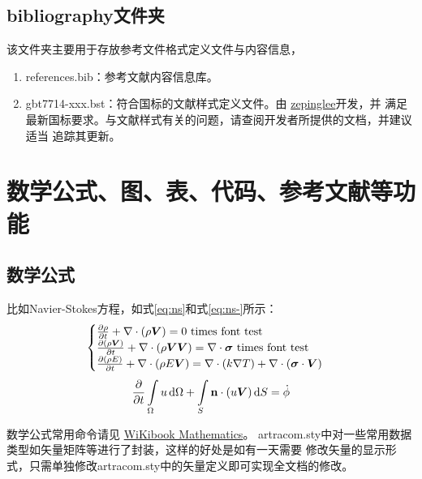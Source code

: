 \subsection{bibliography文件夹}

该文件夹主要用于存放参考文件格式定义文件与内容信息，

\begin{enumerate}
    \item references.bib：参考文献内容信息库。
    \item gbt7714-xxx.bst：符合国标的文献样式定义文件。由
    \href{https://github.com/zepinglee/gbt7714-bibtex-style}{zepinglee}开发，并
    满足最新国标要求。与文献样式有关的问题，请查阅开发者所提供的文档，并建议适当
    追踪其更新。
\end{enumerate}

\section{数学公式、图、表、代码、参考文献等功能}

\subsection{数学公式}

比如Navier-Stokes方程，如式\eqref{eq:ns}和式\eqref{eq:ns-}所示：
\begin{equation} \label{eq:ns}
    \begin{cases}
        \frac{\partial \rho}{\partial t} + \nabla\cdot(\rho\Vector{V}) = 0 \ \mathrm{times\ font\ test}\\
        \frac{\partial (\rho\Vector{V})}{\partial t} + \nabla\cdot(\rho\Vector{V}\Vector{V}) = \nabla\cdot\Tensor{\sigma} \ \text{times font test}\\
        \frac{\partial (\rho E)}{\partial t} + \nabla\cdot(\rho E\Vector{V}) = \nabla\cdot(k\nabla T) + \nabla\cdot(\Tensor{\sigma}\cdot\Vector{V})
    \end{cases}
\end{equation}
\begin{equation} \label{eq:ns-}
    \frac{\partial }{\partial t}\int\limits_{\Omega} u \, \mathrm{d}\Omega + \int\limits_{S} \boldsymbol{\mathbf{n}}\cdot(u\boldsymbol{V}) \, \mathrm{d}S = \dot{\phi}
\end{equation}

数学公式常用命令请见
\href{https://en.wikibooks.org/wiki/LaTeX/Mathematics}{WiKibook Mathematics}。
artracom.sty中对一些常用数据类型如矢量矩阵等进行了封装，这样的好处是如有一天需要
修改矢量的显示形式，只需单独修改artracom.sty中的矢量定义即可实现全文档的修改。

